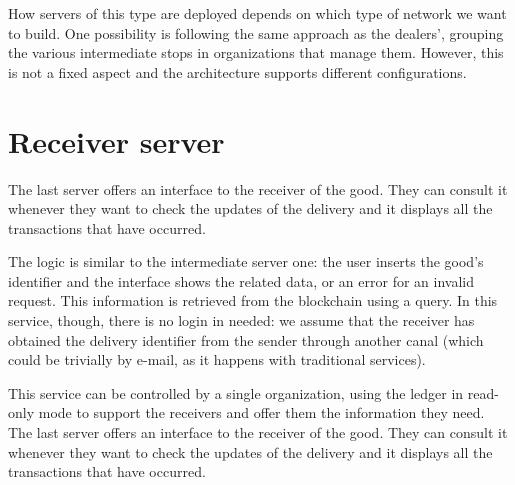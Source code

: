 How servers of this type are deployed depends on which type of network we want to build. One possibility is following the same approach as the dealers', grouping the various intermediate stops in organizations that manage them. However, this is not a fixed aspect and the architecture supports different configurations.

\section{Receiver server}
The last server offers an interface to the receiver of the good. They can consult it whenever they want to check the updates of the delivery and it displays all the transactions that have occurred. 

The logic is similar to the intermediate server one: the user inserts the good's identifier and the interface shows the related data, or an error for an invalid request. This information is retrieved from the blockchain using a query. In this service, though, there is no login in needed: we assume that the receiver has obtained the delivery identifier from the sender through another canal (which could be trivially by e-mail, as it happens with traditional services).

This service can be controlled by a single organization, using the ledger in read-only mode to support the receivers and offer them the information they need.
The last server offers an interface to the receiver of the good. They can consult it whenever they want to check the updates of the delivery and it displays all the transactions that have occurred. 


\newpage